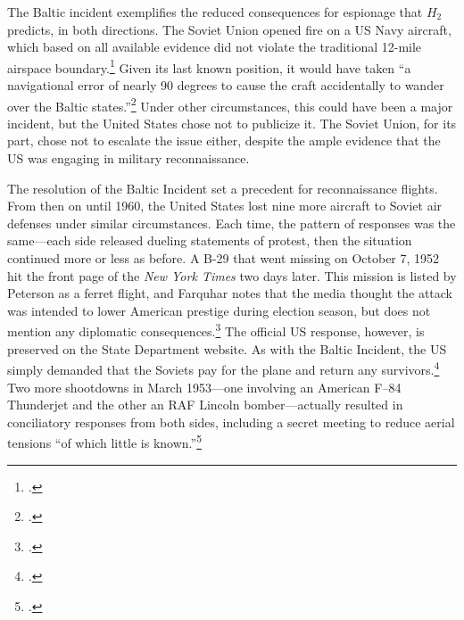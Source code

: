 \documentclass[12pt]{extarticle}
\begin{document}
The Baltic incident exemplifies the reduced consequences for espionage that $H_2$ predicts, in both directions. The Soviet Union opened fire on a US Navy aircraft, which based on all available evidence did not violate the traditional 12-mile airspace boundary.\footcite[7. To be extra specific]{peterson_maybe_1993} Given its last known position, it would have taken ``a navigational error of nearly 90 degrees to cause the craft accidentally to wander over the Baltic states.''\footcite{the_new_york_times_soviet_1950} Under other circumstances, this could have been a major incident, but the United States chose not to publicize it. The Soviet Union, for its part, chose not to escalate the issue either, despite the ample evidence that the US was engaging in military reconnaissance.

The resolution of the Baltic Incident set a precedent for reconnaissance flights. From then on until 1960, the United States lost nine more aircraft to Soviet air defenses under similar circumstances. Each time, the pattern of responses was the same---each side released dueling statements of protest, then the situation continued more or less as before. A B-29 that went missing on October 7, 1952 hit the front page of the \emph{New York Times} two days later. This mission is listed by Peterson as a ferret flight, and Farquhar notes that the media thought the attack was intended to lower American prestige during election season, but does not mention any diplomatic consequences.\footcite[43-44]{farquhar_aerial_2015} The official US response, however, is preserved on the State Department website. As with the Baltic Incident, the US simply demanded that the Soviets pay for the plane and return any survivors.\footcite{the_new_york_times_u.s._1952} Two more shootdowns in March 1953---one involving an American F–84 Thunderjet and the other an RAF Lincoln bomber---actually resulted in conciliatory responses from both sides, including a secret meeting to reduce aerial tensions \enquote{of which little is known.}\footcite[45]{farquhar_aerial_2015}
\end{document}
